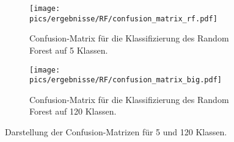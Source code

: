\begin{figure}
  \begin{subfigure}{0.49\textwidth}
    \centering
    \texttt{[image: pics/ergebnisse/RF/confusion\_matrix\_rf.pdf]}
    \caption{Confusion-Matrix für die Klassifizierung des Random Forest auf 5 Klassen.}
    \label{sub:confusion-rf-5}
  \end{subfigure}
  \qquad
  \begin{subfigure}{0.49\textwidth}
    \centering
    \texttt{[image: pics/ergebnisse/RF/confusion\_matrix\_big.pdf]}
    \caption{Confusion-Matrix für die Klassifizierung des Random Forest auf 120 Klassen.}
    \label{sub:confusion-rf-120}
  \end{subfigure}
  \caption{Darstellung der Confusion-Matrizen für 5 und 120 Klassen.}
  \label{fig:confusion-rf}
\end{figure}
